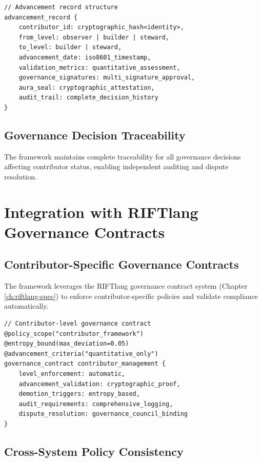 \begin{lstlisting}[style=riftlang, language=rift]
// Advancement record structure
advancement_record {
    contributor_id: cryptographic_hash<identity>,
    from_level: observer | builder | steward,
    to_level: builder | steward,
    advancement_date: iso8601_timestamp,
    validation_metrics: quantitative_assessment,
    governance_signatures: multi_signature_approval,
    aura_seal: cryptographic_attestation,
    audit_trail: complete_decision_history
}
\end{lstlisting}

\subsection{Governance Decision Traceability}

The framework maintains complete traceability for all governance decisions affecting contributor status, enabling independent auditing and dispute resolution.

\section{Integration with RIFTlang Governance Contracts}

\subsection{Contributor-Specific Governance Contracts}

The framework leverages the RIFTlang governance contract system (Chapter \ref{ch:riftlang-spec}) to enforce contributor-specific policies and validate compliance automatically.

\begin{lstlisting}[style=riftlang, language=rift]
// Contributor-level governance contract
@policy_scope("contributor_framework")
@entropy_bound(max_deviation=0.05)
@advancement_criteria("quantitative_only")
governance_contract contributor_management {
    level_enforcement: automatic,
    advancement_validation: cryptographic_proof,
    demotion_triggers: entropy_based,
    audit_requirements: comprehensive_logging,
    dispute_resolution: governance_council_binding
}
\end{lstlisting}

\subsection{Cross-System Policy Consistency}

